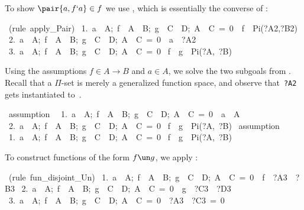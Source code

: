 To show $\pair{a,f`a}\in f$ we use , which is
essentially the converse of :
\begin{isabelle}
\ (rule\ apply\_Pair)\isanewline
\ 1.\ \isasymlbrakk a\ \isasymin \ A;\ f\ \isasymin \ A\ \isasymrightarrow \ B;\ g\ \isasymin \ C\ \isasymrightarrow \ D;\ A\ \isasyminter \ C\ =\ 0\isasymrbrakk \ \isasymLongrightarrow \ f\ \isasymin \ Pi(?A2,?B2)\isanewline
\ 2.\ \isasymlbrakk a\ \isasymin \ A;\ f\ \isasymin \ A\ \isasymrightarrow \ B;\ g\ \isasymin \ C\ \isasymrightarrow \ D;\ A\ \isasyminter \ C\ =\ 0\isasymrbrakk \ \isasymLongrightarrow \ a\ \isasymin \ ?A2\isanewline
\ 3.\ \isasymlbrakk a\ \isasymin \ A;\ f\ \isasymin \ A\ \isasymrightarrow \ B;\ g\ \isasymin \ C\ \isasymrightarrow \ D;\ A\ \isasyminter \ C\ =\ 0\isasymrbrakk \isanewline
{}\isasymLongrightarrow \ f\ \isasymunion \ g\ \isasymin \ Pi(?A,\ ?B)
\end{isabelle}
Using the assumptions $f\in A\to B$ and $a\in A$, we solve the two subgoals
from .  Recall that a $\Pi$-set is merely a generalized
function space, and observe that~{\tt?A2} gets instantiated to~.
\begin{isabelle}
\ assumption\ \isanewline
\ 1.\ \isasymlbrakk a\ \isasymin \ A;\ f\ \isasymin \ A\ \isasymrightarrow \ B;\ g\ \isasymin \ C\ \isasymrightarrow \ D;\ A\ \isasyminter \ C\ =\ 0\isasymrbrakk \ \isasymLongrightarrow \ a\ \isasymin \ A\isanewline
\ 2.\ \isasymlbrakk a\ \isasymin \ A;\ f\ \isasymin \ A\ \isasymrightarrow \ B;\ g\ \isasymin \ C\ \isasymrightarrow \ D;\ A\ \isasyminter \ C\ =\ 0\isasymrbrakk \isanewline
{}\isasymLongrightarrow \ f\ \isasymunion \ g\ \isasymin \ Pi(?A,\ ?B)
\isanewline
{}\ assumption\ \isanewline
\ 1.\ \isasymlbrakk a\ \isasymin \ A;\ f\ \isasymin \ A\ \isasymrightarrow \ B;\ g\ \isasymin \ C\ \isasymrightarrow \ D;\ A\ \isasyminter \ C\ =\ 0\isasymrbrakk \isanewline
{}\isasymLongrightarrow \ f\ \isasymunion \ g\ \isasymin \ Pi(?A,\ ?B)
\end{isabelle}
To construct functions of the form $f\un g$, we apply
:
\begin{isabelle}
\ (rule\ fun\_disjoint\_Un)\isanewline
\ 1.\ \isasymlbrakk a\ \isasymin \ A;\ f\ \isasymin \ A\ \isasymrightarrow \ B;\ g\ \isasymin \ C\ \isasymrightarrow \ D;\ A\ \isasyminter \ C\ =\ 0\isasymrbrakk \ \isasymLongrightarrow \ f\ \isasymin \ ?A3\ \isasymrightarrow \ ?B3\isanewline
\ 2.\ \isasymlbrakk a\ \isasymin \ A;\ f\ \isasymin \ A\ \isasymrightarrow \ B;\ g\ \isasymin \ C\ \isasymrightarrow \ D;\ A\ \isasyminter \ C\ =\ 0\isasymrbrakk \ \isasymLongrightarrow \ g\ \isasymin \ ?C3\ \isasymrightarrow \ ?D3\isanewline
\ 3.\ \isasymlbrakk a\ \isasymin \ A;\ f\ \isasymin \ A\ \isasymrightarrow \ B;\ g\ \isasymin \ C\ \isasymrightarrow \ D;\ A\ \isasyminter \ C\ =\ 0\isasymrbrakk \ \isasymLongrightarrow \ ?A3\ \isasyminter \ ?C3\ =\ 0
\end{isabelle}
